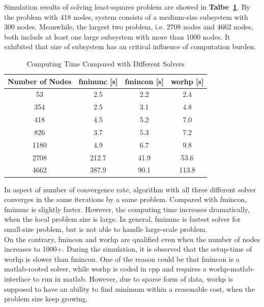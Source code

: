 \documentclass{article}
\begin{document}
Simulation results of solving least-squares problem are showed in \textbf{Talbe~\ref{table: Computing Time Compared with Different Solver}}. By the problem with 418 nodes, system consists of a medium-size subsystem with 300 nodes. Meanwhile, the largest two problem, i.e. 2708 nodes and 4662 nodes, both include at least one large subsystem with more than 1000 nodes. It exhibited that size of subsystem has an critical influence of computation burden. \\
\begin{table}[hbt!]
\centering
 \begin{tabular}{||c c c c||}
 Number of Nodes & fminunc [s] & fmincon [s] & worhp [s]\\ [0.5ex] 
 \hline\hline
 53 & 2.5 & 2.2  & 2.4\\ 
 \hline
 354  & 2.5 & 3.1 & 4.8\\
 \hline
 418  & 4.5 & 5.2 & 7.0\\
 \hline
 826  & 3.7 & 5.3 & 7.2\\
 \hline
 1180  & 4.9 & 6.7 & 9.8 \\
 
 \hline
 2708  & 212.7 & 41.9 & 53.6\\ 
 \hline
 4662  &  387.9 & 90.1 & 113.8\\ [1ex] 
 \hline
\end{tabular}
\caption{Computing Time Compared with Different Solvers}
\label{table: Computing Time Compared with Different Solver}
\end{table}

In aspect of number of convergence rate, algorithm with all three different solver converges in the same iterations by a same problem. Compared with fmincon, fminunc is slightly faster. However, the computing time increases dramatically, when the local problem size is large. In general, fminunc is fastest solver for small-size problem, but is not able to handle large-scale problem.\\

On the contrary, fmincon and worhp are qualified even when the number of nodes increases to 1000+. During the simulation, it is observed that the setup-time of worhp is slower than fmincon. One of the reason could be that fmincon is a matlab-rooted solver, while worhp is coded in cpp and requires a worhp-matlab-interface to run in matlab. However, due to sparse form of data, worhp is supposed to have an ability to find minimum within a reasonable cost, when the problem size keep growing.
\end{document}
